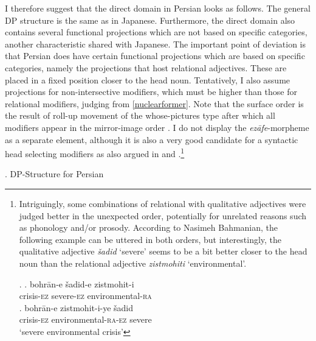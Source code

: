 \documentclass [output=book,colorlinks,citecolor=brown]{langscibook}
\begin{document}
I therefore suggest that the direct domain in Persian looks as follows. The general DP structure is the same as in Japanese. Furthermore, the direct domain also contains several functional projections which are not based on specific categories, another characteristic shared with Japanese. The important point of deviation is that Persian does have certain functional projections which are based on specific categories, namely the projections that host relational adjectives. These are placed in a fixed position closer to the head noun. Tentatively, I also assume projections for non-intersective modifiers, which must be higher than those for relational modifiers, judging from \ref{nuclearformer}. Note that the surface order is the result of roll-up movement of the whose-pictures type after which all modifiers appear in the mirror-image order \citep{cinque:2017:micro, cinque:2023:linearization, kahne:2014:revisiting}. I do not display the \textit{ezāfe}-morpheme as a separate element, although it is also a very good candidate for a syntactic head selecting modifiers as also argued in \citet{philip:2012:linkers, toosarvandani:2014:the, franco:2015:linkers} and \citet{gn:2024:morpho}.\footnote{Intriguingly, some combinations of relational with qualitative adjectives were judged better in the unexpected order, potentially for unrelated reasons such as phonology and/or prosody. According to Nasimeh Bahmanian, the following example can be uttered in both orders, but interestingly, the qualitative adjective \textit{šadid} `severe’ seems to be a bit better closer to the head noun than the relational adjective \textit{zistmohiti} `environmental’.

\par

\ex. \ag. bohrān-e šadid-e zistmohit-i\\
crisis-\textsc{ez} severe-\textsc{ez} environmental-\textsc{ra}\\
\bg. bohrān-e zistmohit-i-ye šadid\\
crisis-\textsc{ez} environmental-\textsc{ra-ez} severe\\
`severe environmental crisis'

\par

}

\ex. DP-Structure for Persian\\
\end{document}
